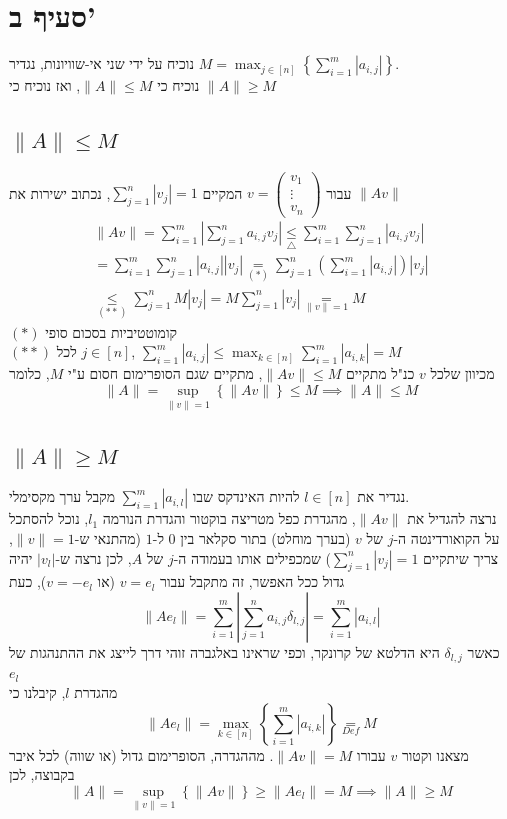 \documentclass[12pt, titlepage]{article}
\begin{document}
\section*{סעיף ב'}
נוכיח על ידי שני אי-שוויונות, נגדיר $M=\max_{j\in\left[n\right]}\left\{\sum_{i=1}^m\left|a_{i,j}\right|\right\}$.\\
נוכיח כי $\lVert A\rVert \leq M$, ואז נוכיח כי $\lVert A\rVert \geq M$
\subsection*{$\lVert A\rVert \leq M$}
עבור $v=\begin{pmatrix}v_1\\\vdots\\v_n\end{pmatrix}$ המקיים $\sum_{j=1}^{n} \left|v_j\right|=1$,
נכתוב ישירות את $\lVert Av\rVert$
\begin{gather*}
  \lVert Av \rVert = \sum_{i=1}^m\left| \sum_{j=1}^n a_{i,j} v_j\right| \underset{\triangle}{\leq}\sum_{i=1}^m\sum_{j=1}^n \left|a_{i,j} v_j\right|\\
  =\sum_{i=1}^m\sum_{j=1}^n \left|a_{i,j}\right|\left| v_j\right| \underset{\left(*\right)}{=} \sum_{j=1}^n\left(\sum_{i=1}^m \left|a_{i,j}\right|\right)\left| v_j\right| \\
  \underset{\left(**\right)}{\leq} \sum_{j=1}^n M \left|v_j\right| = M \sum_{j=1}^n \left|v_j\right| \underset{\lVert v \rVert = 1}{=} M
\end{gather*}
$\left(*\right)$ קומוטטיביות בסכום סופי\\
$\left(**\right)$  לכל $j\in\left[n\right]$, $\sum_{i=1}^m \left|a_{i,j}\right|\leq \max_{k\in\left[n\right]} \sum_{i=1}^m \left|a_{i,k}\right|=M$\\
מכיוון שלכל $v$ כנ"ל מתקיים $\lVert Av \rVert \leq M$, מתקיים שגם הסופרימום חסום ע"י $M$, כלומר
\[
  \lVert A\rVert = \sup_{\lVert v\rVert=1} \left\{\lVert Av\rVert\right\} \leq M \implies \lVert A \rVert \leq M
\]
\subsection*{$\lVert A \rVert \geq M$}
נגדיר את $l\in\left[n\right]$ להיות האינדקס שבו $\sum^m_{i=1}\left|a_{i,l}\right|$ מקבל ערך מקסימלי.\\
נרצה להגדיל את $\lVert Av\rVert$, מהגדרת כפל מטריצה בוקטור והגדרת הנורמה $l_1$, נוכל להסתכל על הקואורדינטה ה-$j$ של $v$ (בערך מוחלט) בתור סקלאר בין $0$ ל-$1$ (מהתנאי ש-$\lVert v\rVert=1$, צריך שיתקיים $\sum_{j=1}^n\left|v_j\right|=1$) שמכפילים אותו בעמודה ה-$j$ של $A$, לכן נרצה ש-$\left|v_l\right|$ יהיה גדול ככל האפשר, זה מתקבל עבור $v=e_l$ (או $v=-e_l$),
כעת
\[
  \lVert Ae_l\rVert = \sum_{i=1}^m\left| \sum_{j=1}^n a_{i,j} \delta_{l,j}\right| = \sum_{i=1}^m \left|a_{i,l}\right|
\]
כאשר $\delta_{l,j}$ היא הדלטא של קרונקר, וכפי שראינו באלגברה זוהי דרך לייצג את ההתנהגות של $e_l$\\
מהגדרת $l$, קיבלנו כי
\[
  \lVert A e_l\rVert = \max_{k\in\left[n\right]}\left\{\sum_{i=1}^m \left|a_{i,k}\right|\right\} \underset{Def}{=} M
\]
מצאנו וקטור $v$ עבורו $\lVert Av\rVert = M$. מההגדרה, הסופרימום גדול (או שווה) לכל איבר בקבוצה, לכן 
\[
 \lVert A \rVert = \sup_{\lVert v\rVert=1} \left\{\lVert Av\rVert\right\} \geq \lVert Ae_l\rVert = M \implies \lVert A \rVert \geq M
\]
\end{document}
